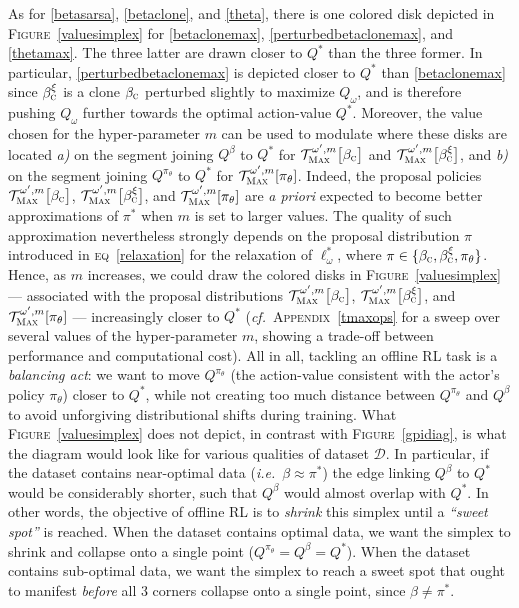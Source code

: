 As for \ref{betasarsa}, \ref{betaclone}, and \ref{theta},
there is one colored disk depicted in \textsc{Figure}~\ref{valuesimplex} for
\ref{betaclonemax}, \ref{perturbedbetaclonemax}, and \ref{thetamax}.
The three latter are drawn closer to $Q^*$ than the three former.
In particular, \ref{perturbedbetaclonemax} is depicted closer to $Q^*$ than \ref{betaclonemax}
since $\beta_\textsc{c}^\xi$ is a clone $\beta_\textsc{c}$ perturbed slightly to maximize $Q_\omega$,
and is therefore pushing $Q_\omega$ further towards the optimal action-value $Q^*$.
Moreover, the value chosen for the hyper-parameter $m$ can be used to modulate where these disks are
located \textit{a)} on the segment joining $Q^\beta$ to $Q^*$ for
$\mathcal{T}_\textsc{Max}^{\omega', m}\big[\beta_\textsc{c}\big]$
and $\mathcal{T}_\textsc{Max}^{\omega', m}\big[\beta_\textsc{c}^\xi\big]$,
and \textit{b)} on the segment joining $Q^{\pi_\theta}$ to $Q^*$ for
$\mathcal{T}_\textsc{Max}^{\omega', m}[\pi_\theta]$.
Indeed, the proposal policies
$\mathcal{T}_\textsc{Max}^{\omega', m}\big[\beta_\textsc{c}\big]$,
$\mathcal{T}_\textsc{Max}^{\omega', m}\big[\beta_\textsc{c}^\xi\big]$, and
$\mathcal{T}_\textsc{Max}^{\omega', m}[\pi_\theta]$
are \textit{a priori} expected to become better approximations of
$\pi^*$ when $m$ is set to larger values.
The quality of such approximation nevertheless strongly depends on
the proposal distribution  $\pi$ introduced in \textsc{eq}~\ref{relaxation}
for the relaxation of $\ell^*_\omega$,
where $\pi \in \{ \beta_\textsc{c},\beta_\textsc{c}^\xi,\pi_\theta \}$.
Hence, as $m$ increases, we could draw the colored disks in \textsc{Figure}~\ref{valuesimplex}
--- associated with the proposal distributions
$\mathcal{T}_\textsc{Max}^{\omega', m}\big[\beta_\textsc{c}\big]$,
$\mathcal{T}_\textsc{Max}^{\omega', m}\big[\beta_\textsc{c}^\xi\big]$, and
$\mathcal{T}_\textsc{Max}^{\omega', m}[\pi_\theta]$ ---
increasingly closer to $Q^*$
(\textit{cf.}~\textsc{Appendix}~\ref{tmaxops} for a sweep over several values of the
hyper-parameter $m$, showing a trade-off between performance and
computational cost).
All in all, tackling an offline RL task is a \emph{balancing act}: we want to move
$Q^{\pi_\theta}$ (the action-value consistent with the actor's policy $\pi_\theta$)
closer to $Q^*$, while not creating too much distance between $Q^{\pi_\theta}$ and $Q^\beta$
to avoid unforgiving distributional shifts during training.
What \textsc{Figure}~\ref{valuesimplex} does not depict,
in contrast with \textsc{Figure}~\ref{gpidiag},
is what the diagram would look like
for various qualities of dataset $\mathcal{D}$.
In particular, if the dataset contains near-optimal data (\textit{i.e.}~$\beta \approx \pi^*$)
the edge linking $Q^\beta$ to $Q^*$ would be considerably shorter,
such that $Q^\beta$ would almost overlap with $Q^*$.
In other words, the objective of offline RL is to \emph{shrink} this simplex
until a \emph{``sweet spot''} is reached.
When the dataset contains optimal data, we want
the simplex to shrink and collapse onto a single point ($Q^{\pi_\theta} = Q^\beta = Q^*$).
When the dataset contains sub-optimal data, we want
the simplex to reach a sweet spot that ought to manifest
\emph{before} all 3 corners collapse onto a single point,
since $\beta \neq \pi^*$.

